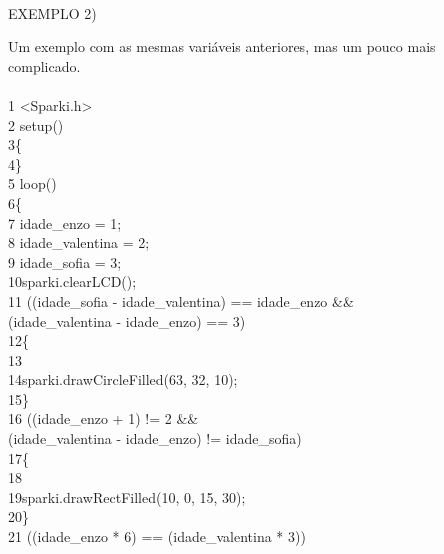 \documentclass[conference]{IEEEtran}
\begin{document}
\\
\begin{center}
EXEMPLO 2)
\end{center}
\par
Um exemplo com as mesmas variáveis anteriores, mas um pouco mais complicado.
\\
\\
{\selectfont 
{\color{cinza}1} <Sparki.h>\\
{\color{cinza}2} setup()\\
{\color{cinza}3}\quad\{\\
{\color{cinza}4}\quad\}\\
{\color{cinza}5} loop()\\
{\color{cinza}6}\quad\{\\
{\color{cinza}7}\quad{} idade\_enzo = 1;\\
{\color{cinza}8}\quad{} idade\_valentina = 2;\\
{\color{cinza}9}\quad{} idade\_sofia = 3;\\
{\color{cinza}10}\quad\quad sparki.clearLCD();\\
{\color{cinza}11}\quad{} ((idade\_sofia - idade\_valentina) == idade\_enzo {\color{verde}\&\&\\} (idade\_valentina - idade\_enzo) == 3)\\
{\color{cinza}12}\quad\quad\{\\
{\color{cinza}13}\quad\quad{}\\
{\color{cinza}14}\quad\quad\quad sparki.drawCircleFilled(63, 32, 10);\\
{\color{cinza}15}\quad\quad\}\\
{\color{cinza}16}\quad{} ((idade\_enzo + 1) != 2 {\color{verde}\&\&\\}(idade\_valentina - idade\_enzo) != idade\_sofia)\\
{\color{cinza}17}\quad\quad\{\\
{\color{cinza}18}\quad\quad{}\\
{\color{cinza}19}\quad\quad\quad sparki.drawRectFilled(10, 0, 15, 30);\\
{\color{cinza}20}\quad\quad\}\\
{\color{cinza}21}\quad{} ((idade\_enzo * 6) == (idade\_valentina * 3))\\
}
\end{document}
